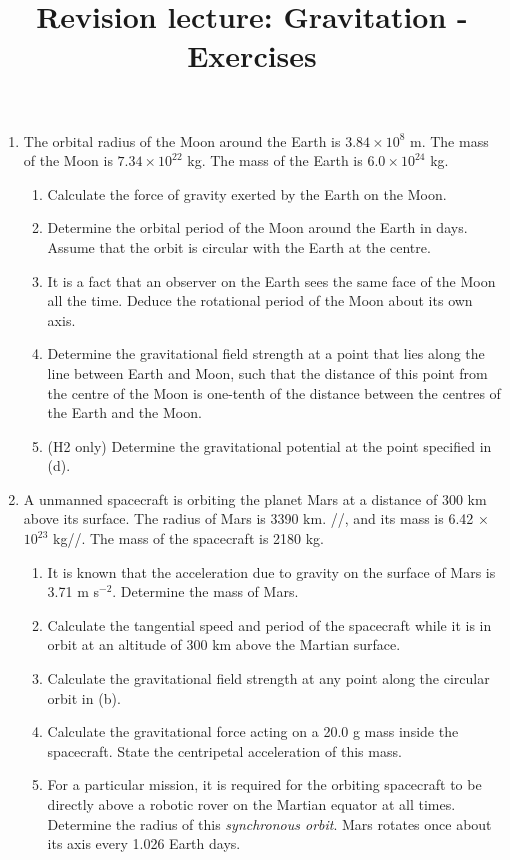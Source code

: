 \documentclass[a4paper,12pt]{article}
\title{Revision lecture: Gravitation - Exercises}
\date{}
\begin{document}
\maketitle


\begin{enumerate}
\item The orbital radius of the Moon around the Earth is $3.84 × 10^8$ m. The mass of the Moon is $7.34 × 10^{22}$ kg. The mass of the Earth is $6.0 × 10^{24}$ kg. 

\begin{enumerate}
\item Calculate the force of gravity exerted by the Earth on the Moon.
\item Determine the orbital period of the Moon around the Earth in days. Assume that the orbit is circular with the Earth at the centre.
\item It is a fact that an observer on the Earth sees the same face of the Moon all the time. Deduce the rotational period of the Moon about its own axis. 
\item Determine the gravitational field strength at a point that lies along the line between Earth and Moon, such that the distance of this point from the centre of the Moon is one-tenth of the distance between the centres of the Earth and the Moon.
\item (H2 only) Determine the gravitational potential at the point specified in (d).
\end{enumerate}

\vspace{1cm}

\item A unmanned spacecraft is orbiting the planet Mars at a distance of 300 km above its surface. The radius of Mars is 3390 km. //, and its mass is 6.42 × $10^{23}$ kg//. The mass of the spacecraft is 2180 kg. 

\begin{enumerate}
\item It is known that the acceleration due to gravity on the surface of Mars is 3.71 m s$^{-2}$. Determine the mass of Mars. 
\item Calculate the tangential speed and period of the spacecraft while it is in orbit at an altitude of 300 km above the Martian surface.
 \item Calculate the gravitational field strength at any point along the circular orbit in (b). 
\item Calculate the gravitational force acting on a 20.0 g mass inside the spacecraft. State the centripetal acceleration of this mass. 
\item For a particular mission, it is required for the orbiting spacecraft to be directly above a robotic rover on the Martian equator at all times. Determine the radius of this \emph{synchronous orbit}. Mars rotates once about its axis every 1.026 Earth days.\\ 


\end{enumerate}
\end{enumerate}
\end{document}
